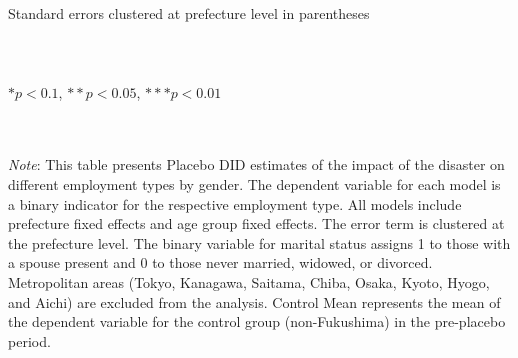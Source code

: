 \documentclass[a4paper,12pt]{article}
\begin{document}
\begin{landscape}
\begin{table}[htbp]
{\begin{tabular}{@{}l*{17}{c}@{}}
\bottomrule
\end{tabular}}
\raggedright
\\\\{\linewidth}{\tiny Standard errors clustered at prefecture level in parentheses}\\\\
\vspace{-0.2cm}
\\\\{\linewidth}{\tiny $*p<0.1$, $**p<0.05$, $***p<0.01$}\\\\
\\
\vspace{0.1cm}
  {\setlength{\baselineskip}{0.9\baselineskip}
  \parbox{\linewidth}{\tiny
  \textit{Note}: This table presents Placebo DID estimates of the impact of the disaster on different employment types by gender. The dependent variable for each model is a binary indicator for the respective employment type. All models include prefecture fixed effects and age group fixed effects. The error term is clustered at the prefecture level. The binary variable for marital status assigns 1 to those with a spouse present and 0 to those never married, widowed, or divorced. Metropolitan areas (Tokyo, Kanagawa, Saitama, Chiba, Osaka, Kyoto, Hyogo, and Aichi) are excluded from the analysis. Control Mean represents the mean of the dependent variable for the control group (non-Fukushima) in the pre-placebo period.}}
\end{table}

\label{table:Placebo_DID_Each_Employment_Type}

\end{landscape}



\end{document}
